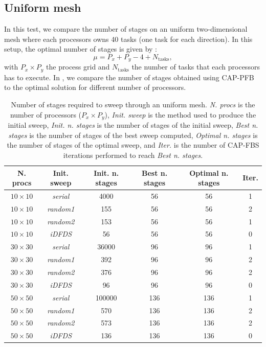 \documentclass[letterpaper]{article}
\renewcommand{\(}{\left(}
\renewcommand{\)}{\right)}
\renewcommand{\[}{\left[}
\renewcommand{\]}{\right]}
\begin{document}
\subsection{Uniform mesh}
In this test, we compare the number of stages on an uniform two-dimensional mesh 
where each processors owns 40 tasks (one task for each direction). In this
setup, the optimal number of stages is given by \cite{Adams2013}:
\begin{equation}
  \mu = P_x + P_y - 4 + N_{\textrm{tasks}},
\end{equation}
with $P_x \times P_y$ the process grid and $N_{\textrm{tasks}}$ the number of
tasks that each processors has to execute. In , we compare the number of
stages obtained using CAP-PFB to the optimal solution for different number of
processors.
\begin{table}[H]
  \begin{center}
    \begin{tabular}{|c|c|c|c|c|c|}
      \hline
      N. procs & Init. sweep & Init. n. stages & Best n. stages & Optimal n. stages & Iter. \\
      \hline
      $10\times 10$ & \emph{serial}  &   4000 &  56 &  56 & 1 \\
      $10\times 10$ & \emph{random1} &    155 &  56 &  56 & 2 \\
      $10\times 10$ & \emph{random2} &    153 &  56 &  56 & 1 \\
      $10\times 10$ & \emph{iDFDS}   &     56 &  56 &  56 & 0 \\
      $30\times 30$ & \emph{serial}  &  36000 &  96 &  96 & 1 \\
      $30\times 30$ & \emph{random1} &    392 &  96 &  96 & 2 \\
      $30\times 30$ & \emph{random2} &    376 &  96 &  96 & 2 \\
      $30\times 30$ & \emph{iDFDS}   &     96 &  96 &  96 & 0 \\
      $50\times 50$ & \emph{serial}  & 100000 & 136 & 136 & 1 \\
      $50\times 50$ & \emph{random1} &    570 & 136 & 136 & 2 \\ 
      $50\times 50$ & \emph{random2} &    573 & 136 & 136 & 2 \\
      $50\times 50$ & \emph{iDFDS}   &    136 & 136 & 136 & 0 \\
      \hline
    \end{tabular}
    \caption{Number of stages required to sweep through an uniform mesh.
      \emph{N. procs} is the number of processors ($P_x \times P_y$), \emph{Init. sweep} is the
      method used to produce the initial sweep, \emph{Init. n. stages} is the
      number of stages of the initial sweep, \emph{Best n. stages} is the
      number of stages of the best sweep computed, \emph{Optimal n. stages} is the
      number of stages of the optimal sweep, and \emph{Iter.} is the number
    of CAP-FBS iterations performed to reach \emph{Best n. stages}.}
    \label{uniform}
  \end{center}
\end{table}
\end{document}
